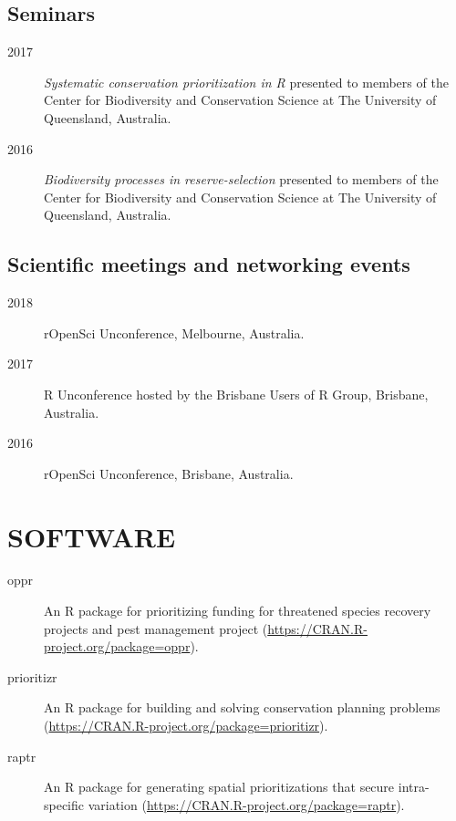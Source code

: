 \documentclass[12pt,a4paper]{article}
\begin{document}
\subsection*{Seminars}
\begin{description}

\item[2017] \textit{Systematic conservation prioritization in R} presented to members of the Center for Biodiversity and Conservation Science at The University of Queensland, Australia.

\item[2016] \textit{Biodiversity processes in reserve-selection} presented to members of the Center for Biodiversity and Conservation Science at The University of Queensland, Australia.

\end{description}

\subsection*{Scientific meetings and networking events}
\begin{description}

\item [2018] rOpenSci Unconference, Melbourne, Australia.

\item[2017] R Unconference hosted by the Brisbane Users of R Group, Brisbane, Australia.

\item[2016] rOpenSci Unconference, Brisbane, Australia.
\end{description}

\section*{SOFTWARE}
\begin{description}

\item[oppr] An R package for prioritizing funding for threatened species recovery projects and pest management project (\url{https://CRAN.R-project.org/package=oppr}).

\item[prioritizr] An R package for building and solving conservation planning problems (\url{https://CRAN.R-project.org/package=prioritizr}).

\item[raptr] An R package for generating spatial prioritizations that secure intra-specific variation (\url{https://CRAN.R-project.org/package=raptr}).

\end{description}
\end{document}
